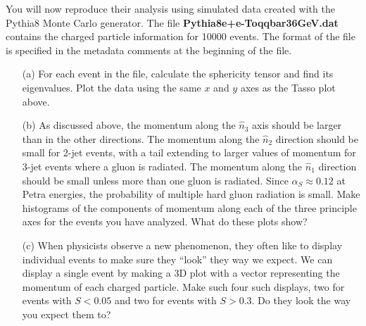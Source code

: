 \documentclass[12pt]{article}
\begin{document}
You will now reproduce their analysis using simulated
data created with the Pythia8 Monte Carlo generator.  The file
{\bf Pythia8e+e-Toqqbar36GeV.dat} contains the charged particle information
for 10000 events.  The format of the file is specified
in the metadata comments at the beginning of the file.
\begin{enumerate}
\item[(a)] For each event in the file, calculate the
  sphericity tensor and find its eigenvalues.  Plot the
  data using the same $x$ and $y$ axes as the Tasso plot
  above.
\item[(b)] As discussed above, the momentum along the $\hat n_3$
  axis should be larger than in the other directions.
  The momentum along the $\hat n_2$
  direction should be small for 2-jet events, with a tail
  extending to larger values of momentum for
  3-jet events where a gluon is radiated.  The momentum
  along the $\hat n_1$ direction should be small unless more
  than one gluon is radiated.  Since $\alpha_S\approx 0.12$ at Petra
  energies, the probability of
  multiple hard gluon radiation is small.  Make
  histograms of the components of momentum along each
  of the three principle axes for the events you have analyzed.
  What do these plots show?
\item[(c)] When physicists observe a new phenomenon, they often
  like to display individual events to make sure they ``look''
  they way we expect.  We can display a single event by
  making a 3D plot with a vector representing the momentum
  of each charged particle.  Make such four such displays,
  two for
  events with $S<0.05$ and two for events with $S>0.3$.  Do
  they look the way you expect them to?
\end{enumerate}
\end{document}
